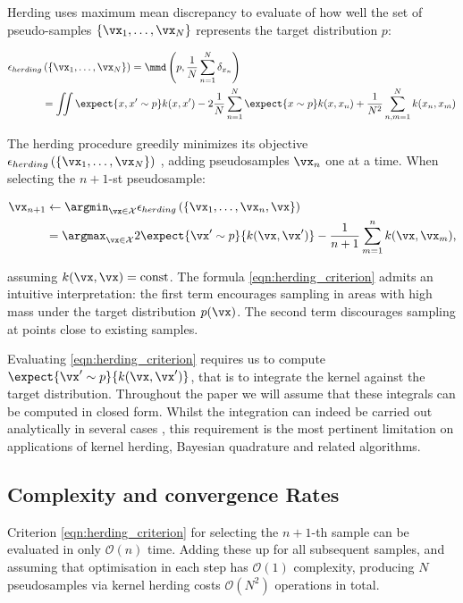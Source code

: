 Herding uses maximum mean discrepancy to evaluate of how well the set of pseudo-samples $\{\vx_1,\ldots,\vx_{N}\}$ represents the target distribution $p$:

\begin{align}
	\epsilon_{herding}&\left(\{\vx_1,\ldots,\vx_{N}\}\right) = \mmd\left(p,\frac{1}{N}\sum_{n=1}^{N}\delta_{x_n}\right)\\
	&=\iint \expect{x,x'\sim p} k(x,x') - 2 \frac{1}{N}\sum_{n=1}^{N} \expect{x\sim p}k(x,x_n)
		+ \frac{1}{N^2}\sum_{n,m=1}^{N} k(x_n,x_m)
\label{eq:mmd_assumption}
\end{align}

The herding procedure greedily minimizes its objective $\epsilon_{herding}\left(\{\vx_1,\ldots,\vx_{N}\}\right)$ , adding pseudosamples $\vx_n$ one at a time. When selecting the $n+1$-st pseudosample:

\begin{align}
\vx_{n+1} &\leftarrow \argmin_{\vx \in \mathcal{X}} \label{eqn:herding_criterion} \epsilon_{herding}\left(\{\vx_1,\ldots,\vx_{n},\vx\}\right)\\
	&= \argmax_{\vx \in \mathcal{X}} 2 \expect{\vx' \sim p}{k(\vx, \vx')} - \frac{1}{n+1}\sum_{m=1}^{n} k(\vx,\vx_m)\mbox{,}
\end{align}

assuming $k(\vx,\vx) = \mbox{const}$.
The formula \eqref{eqn:herding_criterion} admits an intuitive interpretation: the first term encourages sampling in areas with high mass under the target distribution $p(\vx)$. The second term discourages sampling at points close to existing samples. 

Evaluating \eqref{eqn:herding_criterion} requires us to compute $\expect{\vx' \sim p}{k(\vx, \vx')} $, that is to integrate the kernel against the target distribution. Throughout the paper we will assume that these integrals can be computed in closed form. Whilst the integration can indeed be carried out analytically in several cases \citep{Song2008,Chen2010}, this requirement is the most pertinent limitation on applications of kernel herding, Bayesian quadrature and related algorithms.

\subsection{Complexity and convergence Rates}

Criterion \eqref{eqn:herding_criterion} for selecting the $n+1$-th sample can be evaluated in only $\mathcal{O}(n)$ time. Adding these up for all subsequent samples, and assuming that optimisation in each step has $\mathcal{O}(1)$ complexity, producing $N$ pseudosamples via kernel herding costs $\mathcal{O}(N^2)$ operations in total.


